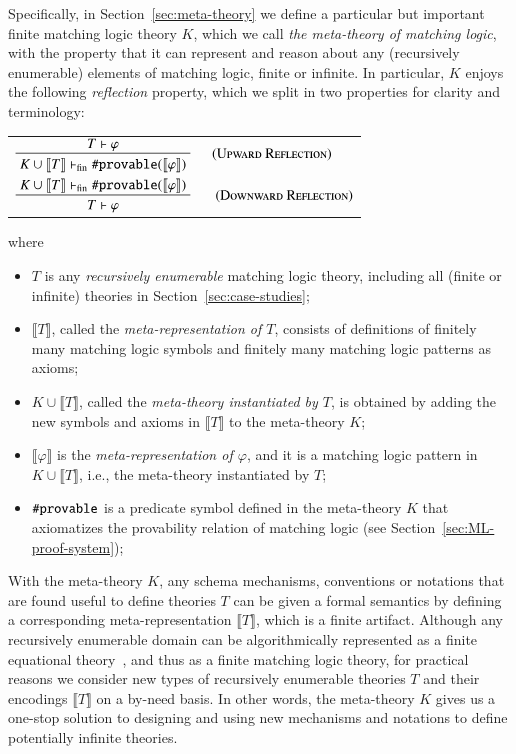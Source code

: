 \documentclass[UTF8,11pt]{article}
\theoremstyle{plain}
\theoremstyle{definition}
\theoremstyle{remark}
\newcommand{\vdashfin}{\vdash_\text{fin}}
\newcommand{\denote}[1]{\llbracket{#1}\rrbracket}
\newcommand{\sharpsymbol}{\#}
\newcommand{\Kdeduce}{\textup{\texttt{\sharpsymbol provable}}}
\begin{document}
Specifically, in Section~\ref{sec:meta-theory} we define a particular but
important finite matching logic theory $K$, which we call
\emph{the meta-theory of matching logic}, with the property that it can
represent and reason about any (recursively enumerable) elements of
matching logic, finite or infinite.
In particular, $K$ enjoys the following \emph{reflection} property, which we
split in two properties for clarity and terminology:
\begin{center}
 \begin{tabular}{l}
  $
  \prftree[r]{\hspace*{3ex}\textsc{(Upward Reflection)}}
  {T \vdash \varphi}
  {K \cup \denote{T} \vdashfin \Kdeduce(\denote{\varphi})}
  $
  \\[4ex]
  $
  \prftree[r]{\hspace*{3ex} \textsc{(Downward Reflection)}}
  {K \cup \denote{T} \vdashfin \Kdeduce(\denote{\varphi})}
  {T \vdash \varphi}
  $
 \end{tabular}
\end{center}
where
\begin{itemize}
 \item $T$ is any \emph{recursively enumerable} matching logic theory,
 including all (finite or infinite) theories in
 Section~\ref{sec:case-studies};
 \item $\denote{T}$, called the \emph{meta-representation of $T$}, consists
 of definitions of finitely many matching logic symbols and finitely many
 matching logic patterns as axioms;
 \item $K \cup \denote{T}$, called the \emph{meta-theory instantiated by
 $T$}, is obtained by adding the new symbols and axioms in
 $\denote{T}$ to the meta-theory $K$;
 \item $\denote{\varphi}$ is the \emph{meta-representation of $\varphi$},
 and it is a matching logic pattern in $K \cup \denote{T}$, i.e., the
 meta-theory instantiated by $T$;
 \item $\Kdeduce$ is a predicate symbol defined in the meta-theory $K$ that
 axiomatizes the provability relation of matching logic (see
 Section~\ref{sec:ML-proof-system});
\end{itemize}
 
With the meta-theory $K$, any schema mechanisms, conventions or notations
that are found useful to define theories $T$ can be given a formal semantics by
defining a corresponding meta-representation $\denote{T}$, which is a finite
artifact.
Although any recursively enumerable domain can be algorithmically represented
as a finite equational theory~\cite{bt95}, and thus as a finite matching logic
theory, for practical reasons we consider new types of recursively
enumerable theories $T$ and their encodings $\denote{T}$ on a by-need basis.
In other words, the meta-theory $K$ gives us a one-stop solution to designing
and using new mechanisms and notations to define potentially infinite
theories.
\end{document}
